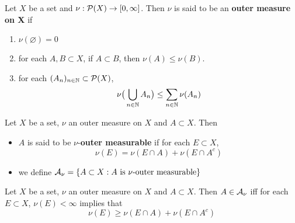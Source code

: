 \documentclass{book}
\begin{document}
	\begin{defn}  
		Let $X$ be a set and $\nu : \mathcal{P}(X) \rightarrow [0, \infty]$. Then $\nu$ is said to be an \textbf{outer measure on X} if 
		\begin{enumerate}
			\item $\nu(\varnothing) = 0$
			\item for each $A,B \subset X $, if $A \subset B$, then $\nu(A) \leq \nu(B)$.
			\item for each $(A_n)_{n \in \mathbb{N}} \subset \mathcal{P}(X)$, $$\nu\big(\bigcup\limits_{n \in \mathbb{N}} A_n\big) \leq \sum\limits_{n \in \mathbb{N}}\nu(A_n) $$
		\end{enumerate}
	\end{defn}
	
	\begin{defn}  
		Let $X$ be a set, $\nu$ an outer measure on $X$ and $A \subset X$. Then 
		\begin{itemize}
			\item $A$ is said to be $\nu$-\textbf{outer measurable} if for each $E \subset X$, 
			\begin{equation*}
				\nu(E) = \nu(E \cap A) + \nu(E \cap A^c)
			\end{equation*}
			\item we define $\mathcal{A}_{\nu} = \{A \subset X: A \text{ is }\nu \text{-outer measurable}\}$
		\end{itemize}
	\end{defn}
	
	\begin{ex}  
	Let $X$ be a set, $\nu$ an outer measure on $X$ and $A \subset X$. Then $A \in \mathcal{A}_{\nu}$ iff for each $E \subset X$, $\nu(E) < \infty$ implies that 
	\begin{equation*}
	\nu(E) \geq \nu(E \cap A) + \nu(E \cap A^c)
	\end{equation*}
	\end{ex}	
	
\end{document}
